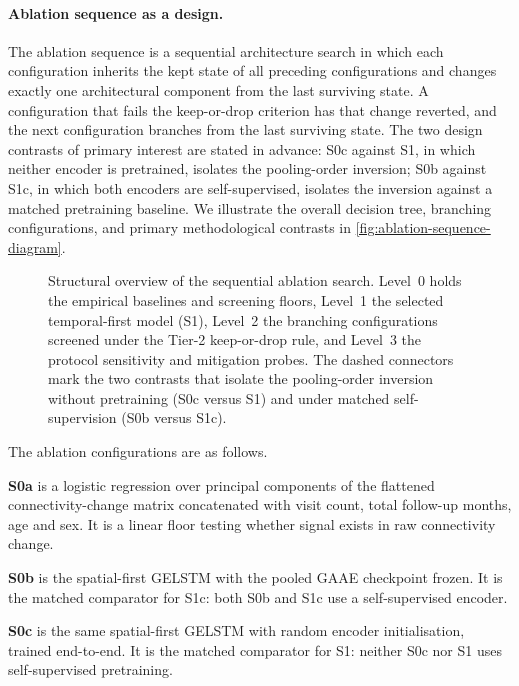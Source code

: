 \paragraph{Ablation sequence as a design.}
The ablation sequence is a sequential architecture search in which each configuration inherits the
kept state of all preceding configurations and changes exactly one architectural
component from the last surviving state. A configuration that fails the keep-or-drop
criterion has that change reverted, and the next configuration branches from the last
surviving state. The two design contrasts of
primary interest are stated in advance: S0c against S1, in which neither encoder is
pretrained, isolates the pooling-order inversion; S0b against S1c, in which both encoders
are self-supervised, isolates the inversion against a matched pretraining baseline. We illustrate the overall decision tree, branching configurations, and primary methodological contrasts in \autoref{fig:ablation-sequence-diagram}.

\begin{figure}[p]
  \centering
  \resizebox{!}{0.80\textheight}{}
  \caption{Structural overview of the sequential ablation search. Level~0 holds the empirical baselines and screening floors, Level~1 the selected temporal-first model (S1), Level~2 the branching configurations screened under the Tier-2 keep-or-drop rule, and Level~3 the protocol sensitivity and mitigation probes. The dashed connectors mark the two contrasts that isolate the pooling-order inversion without pretraining (S0c versus S1) and under matched self-supervision (S0b versus S1c).}
  \label{fig:ablation-sequence-diagram}
\end{figure}

The ablation configurations are as follows.

\textbf{S0a} is a logistic regression over principal components of the flattened
connectivity-change matrix concatenated with visit count, total follow-up months, age and
sex. It is a linear floor testing whether signal exists in raw connectivity change.

\textbf{S0b} is the spatial-first \ac{GELSTM} with the pooled \ac{GAAE} checkpoint frozen.
It is the matched comparator for S1c: both S0b and S1c use a self-supervised encoder.

\textbf{S0c} is the same spatial-first \ac{GELSTM} with random encoder initialisation,
trained end-to-end. It is the matched comparator for S1: neither S0c nor S1 uses
self-supervised pretraining.

